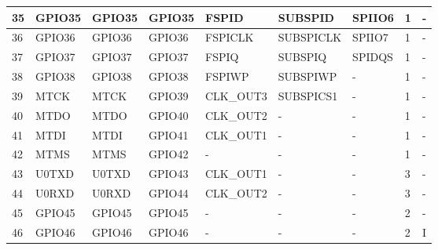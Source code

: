 \begin{longtable}[c]{|p{0.7cm}|p{1.9cm}|p{1.9cm}|p{1.6cm}|p{1.6cm}|p{1.8cm}|p{1.6cm}|p{0.7cm}|p{0.7cm}| }
35 & GPIO35          &  GPIO35       & GPIO35  & FSPID      & SUBSPID      & SPIIO6      & 1 & -    \\ \hline
36 & GPIO36          &  GPIO36       & GPIO36  & FSPICLK    & SUBSPICLK    & SPIIO7      & 1 & -    \\ \hline
37 & GPIO37          &  GPIO37       & GPIO37  & FSPIQ      & SUBSPIQ      & SPIDQS      & 1 & -    \\ \hline
38 & GPIO38          &  GPIO38       & GPIO38  & FSPIWP     & SUBSPIWP     & -           & 1 & -    \\ \hline
39 & MTCK            &  MTCK         & GPIO39  & CLK\_OUT3  & SUBSPICS1    & -           & 1 & -    \\ \hline
40 & MTDO            &  MTDO         & GPIO40  & CLK\_OUT2  & -            & -           & 1 & -    \\ \hline
41 & MTDI            &  MTDI         & GPIO41  & CLK\_OUT1  & -            & -           & 1 & -    \\ \hline
42 & MTMS            &  MTMS         & GPIO42  & -          & -            & -           & 1 & -    \\ \hline
43 & U0TXD           &  U0TXD        & GPIO43  & CLK\_OUT1  & -            & -           & 3 & -    \\ \hline
44 & U0RXD           &  U0RXD        & GPIO44  & CLK\_OUT2  & -            & -           & 3 & -    \\ \hline
45 & GPIO45          &  GPIO45       & GPIO45  & -          & -            & -           & 2 & -    \\ \hline
46 & GPIO46          &  GPIO46       & GPIO46  & -          & -            & -           & 2 & I    \\ \hline

    \end{longtable}
\normalsize
